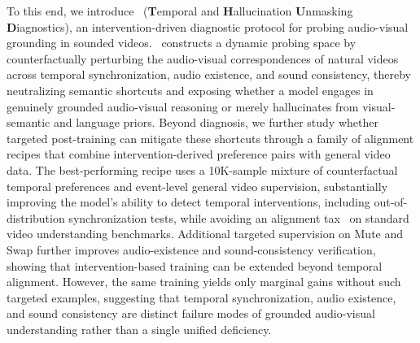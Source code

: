 To this end, we introduce \textbf{\Thud}~(\textbf{T}emporal and \textbf{H}allucination \textbf{U}nmasking \textbf{D}iagnostics), an intervention-driven diagnostic protocol for probing audio-visual grounding in sounded videos. \Thud~constructs a dynamic probing space by counterfactually perturbing the audio-visual correspondences of natural videos across temporal synchronization, audio existence, and sound consistency, thereby neutralizing semantic shortcuts and exposing whether a model engages in genuinely grounded audio-visual reasoning or merely hallucinates from visual-semantic and language priors. Beyond diagnosis, we further study whether targeted post-training can mitigate these shortcuts through a family of alignment recipes that combine intervention-derived preference pairs with general video data. The best-performing recipe uses a 10K-sample mixture of counterfactual temporal preferences and event-level general video supervision, substantially improving the model's ability to detect temporal interventions, including out-of-distribution synchronization tests, while avoiding an alignment tax~\cite{Askell2021AGL,DBLP:conf/nips/Ouyang0JAWMZASR22} on standard video understanding benchmarks. 
Additional targeted supervision on Mute and Swap further improves audio-existence and sound-consistency verification, showing that intervention-based training can be extended beyond temporal alignment.
However, the same training yields only marginal gains without such targeted examples, suggesting that temporal synchronization, audio existence, and sound consistency are distinct failure modes of grounded audio-visual understanding rather than a single unified deficiency.



